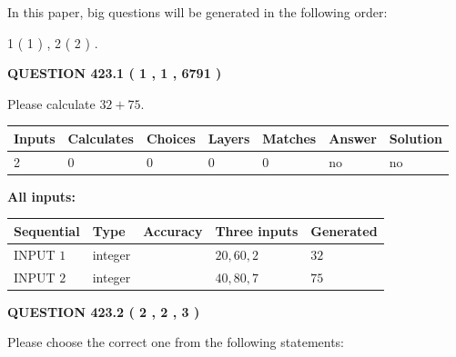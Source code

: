 \documentclass[12pt]{article}
\begin{document}
\vspace{0.2in}
   
In this paper, big questions will be generated in the following order: 
   
   
   1 ( 1 )
 ,
   2 ( 2 )
 .
  
\vspace{0.2in}
  
{\textbf{\Large{QUESTION
423.1 
 ( 1 , 1 , 6791 )
}}}
  
  
 
Please calculate $ %
32 +  %
75 $.
 
 
   
   
   
   
\noindent\begin{tabular}{|l|l|l|l|l|l|l|}
 \hline
Inputs & Calculates & Choices & Layers & Matches & Answer & Solution \\ \hline
 2  & 
 0  & 
 0
  & 
 0  & 
 0  & 
  no & 
  no 
  \\ \hline
 \end{tabular}
   
   
   
   
\noindent{}
   
   
   
   
\noindent\vspace{0.1in}\hspace{-0.08in} {\textbf{\Large{All inputs: }}}
   
   
  
  
\noindent\begin{tabular}{|l|l|l|l|l|}
\hline
 Sequential & Type & Accuracy & Three inputs & Generated \\ 
\hline
 
 
  INPUT $  1 $ & integer &  & $
 20
 , 
 60
 , 
 2
 $ & $ 32 $ 
 \\  \hline  
 
 
  INPUT $  2 $ & integer &  & $
 40
 , 
 80
 , 
 7
 $ & $ 75 $ 
 \\  \hline  
 \end{tabular}
   
   
  
\vspace{0.2in}
  
{\textbf{\Large{QUESTION
423.2 
 ( 2 , 2 , 3 )
}}}
  
  
Please choose the correct one from the following statements:
 
\end{document}
